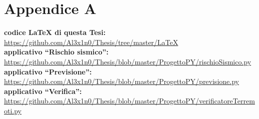 \chapter*{Appendice A}

\textbf{codice LaTeX di questa Tesi:}\\
\url{https://github.com/Al3x1n0/Thesis/tree/master/LaTeX}\\
\textbf{applicativo ``Rischio sismico'':}\\
\url{https://github.com/Al3x1n0/Thesis/blob/master/ProgettoPY/rischioSismico.py}\\
\textbf{applicativo ``Previsione'':}\\
\url{https://github.com/Al3x1n0/Thesis/blob/master/ProgettoPY/previsione.py}
\textbf{applicativo ``Verifica'':}\\
\url{https://github.com/Al3x1n0/Thesis/blob/master/ProgettoPY/verificatoreTerremoti.py}